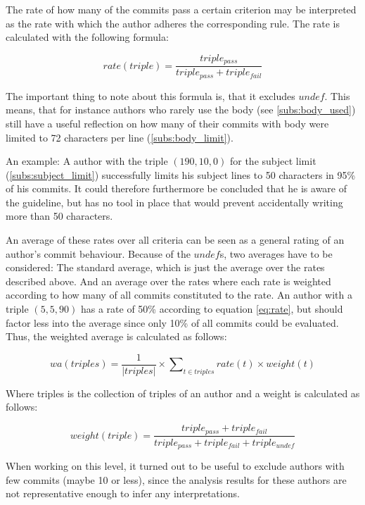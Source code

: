 The rate of how many of the commits pass a certain criterion may be interpreted as the rate with which the author adheres the corresponding rule. The rate is calculated with the following formula:

\begin{equation}
  \label{eq:rate}
  rate(triple) = \frac{triple_{pass}}{triple_{pass} + triple_{fail}}
\end{equation}

The important thing to note about this formula is, that it excludes $undef$. This means, that for instance authors who rarely use the body (see \ref{subs:body_used}) still have a useful reflection on how many of their commits with body were limited to 72 characters per line (\ref{subs:body_limit}).

An example: A author with the triple $(190, 10, 0)$ for the subject limit (\ref{subs:subject_limit}) successfully limits his subject lines to 50 characters in 95\% of his commits. It could therefore furthermore be concluded that he is aware of the guideline, but has no tool in place that would prevent accidentally writing more than 50 characters.

An average of these rates over all criteria can be seen as a general rating of an author's commit behaviour. Because of the $undef$s, two averages have to be considered: The standard average, which is just the average over the rates described above. And an average over the rates where each rate is weighted according to how many of all commits constituted to the rate. An author with a triple $(5, 5, 90)$ has a rate of 50\% according to equation \ref{eq:rate}, but should factor less into the average since only 10\% of all commits could be evaluated. Thus, the weighted average is calculated as follows:

\begin{equation}
  \label{eq:weightedAverage}
  wa(triples) = \frac{1}{|triples|} \times \sum\nolimits_{t \in triples} rate(t) \times weight(t)
\end{equation}

Where triples is the collection of triples of an author and a weight is calculated as follows:

\begin{equation}
  weight(triple) = \frac{triple_{pass} + triple_{fail}}{triple_{pass} + triple_{fail} + triple_{undef}}
\end{equation}

When working on this level, it turned out to be useful to exclude authors with few commits (maybe 10 or less), since the analysis results for these authors are not representative enough to infer any interpretations.

